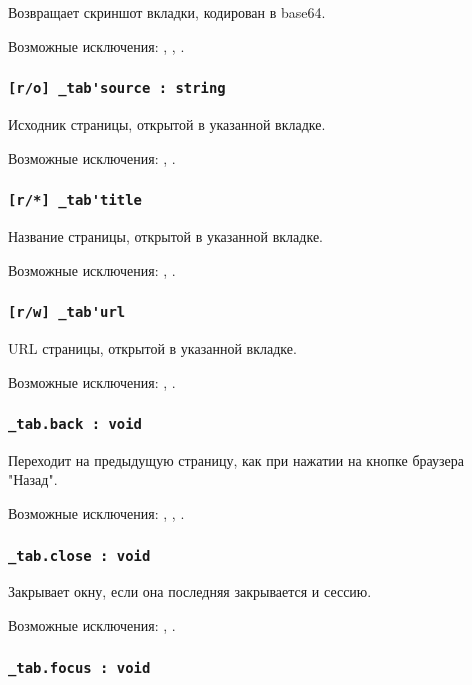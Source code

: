 Возвращает скриншот вкладки, кодирован в base64.

Возможные исключения: , , .

\subsubsection{\lstinline|[r/o] _tab'source : string|}

Исходник страницы, открытой в указанной вкладке.

Возможные исключения: , .

\subsubsection{\lstinline|[r/*] _tab'title|}

Название страницы, открытой в указанной вкладке.

Возможные исключения: , .

\subsubsection{\lstinline|[r/w] _tab'url|}

URL страницы, открытой в указанной вкладке.

Возможные исключения: , .

\subsubsection{\lstinline|_tab.back : void|}

Переходит на предыдущую страницу, как при нажатии на кнопке браузера "Назад".

Возможные исключения: , , .

\subsubsection{\lstinline|_tab.close : void|}

Закрывает окну, если она последняя закрывается и сессию.

Возможные исключения: , .

\subsubsection{\lstinline|_tab.focus : void|}

